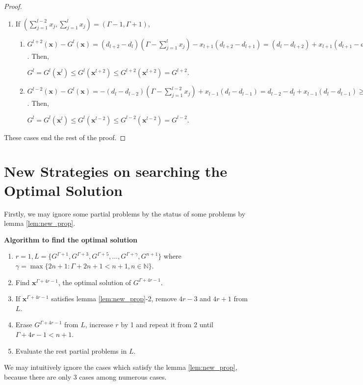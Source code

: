 \documentclass[letterpaper, 10pt]{article}
\renewcommand{\vec}[1]{\bm{#1}}
\begin{document}
\begin{proof}
\begin{enumerate}
\begin{enumerate}
\begin{center}
				$G^{l} = G^{l}(\vec{x}^{l}) \le G^{l}(\vec{x}^{l-2}) \le G^{l-2}(\vec{x}^{l-2}) = G^{l-2}$.
			\end{center}
		\end{enumerate}
		\item If $\left( \sum\limits_{j=1}^{l-2}{x_{j}}, \sum\limits_{j=1}^{l}{x_{j}}  \right) = (\Gamma - 1, \Gamma+1)$,
		\begin{enumerate}
			\item $G^{l+2}(\vec{x}) - G^{l}(\vec{x}) = (d_{l+2} - d_{l}) \left( \Gamma - \sum\limits_{j=1}^{l}{x_{j}} \right) - x_{l+1}(d_{l+2} - d_{l+1}) = (d_{l} - d_{l+2}) + x_{l+1}(d_{l+1} - d_{l+2}) \ge 0$. Then,
			\begin{center}
				$G^{l} = G^{l}(\vec{x}^{l}) \le G^{l}(\vec{x}^{l+2}) \le G^{l+2}(\vec{x}^{l+2}) = G^{l+2}$.
			\end{center}
			\item $G^{l-2}(\vec{x}) - G^{l}(\vec{x}) = -(d_{l} - d_{l-2}) \left( \Gamma - \sum\limits_{j=1}^{l-2}{x_{j}} \right) + x_{l-1}(d_{l} - d_{l-1}) =  d_{l-2} - d_{l} + x_{l-1}(d_{l} - d_{l-1}) \ge d_{l-2} - d_{l} + d_{l} - d_{l-1} = (d_{l-2} - d_{l-1}) \ge 0$. Then,
			\begin{center}
				$G^{l} = G^{l}(\vec{x}^{l}) \le G^{l}(\vec{x}^{l-2}) \le G^{l-2}(\vec{x}^{l-2}) = G^{l-2}$.
			\end{center}
		\end{enumerate}
	\end{enumerate}
	These cases end the rest of the proof.
\end{proof}

\section{New Strategies on searching the Optimal Solution}
Firstly, we may ignore some partial problems by the status of some problems by lemma \ref{lem:new_prop}.

\textbf{Algorithm to find the optimal solution}
\begin{enumerate}
	\item $r=1, L = \{ G^{\Gamma + 1}, G^{\Gamma + 3}, G^{\Gamma + 5}, \ldots, G^{\Gamma + \gamma}, G^{n+1} \}$ where $\gamma = \max\{{2n+1 : \Gamma + 2n + 1 < n+1, n \in \mathbb{N}} \}$.
	\item Find $\vec{x}^{\Gamma + 4r - 1}$, the optimal solution of $G^{\Gamma + 4r - 1}$.
	\item If $\vec{x}^{\Gamma + 4r - 1}$ satisfies lemma \ref{lem:new_prop}-2, remove $4r-3$ and $4r+1$ from $L$.
	\item Erase $G^{\Gamma + 4r - 1}$ from $L$, increase $r$ by 1 and repeat it from 2 until $\Gamma + 4r-1 < n+1$.
	\item Evaluate the rest partial problems in $L$.
\end{enumerate}
We may intuitively ignore the cases which satisfy the lemma \ref{lem:new_prop}, because there are only 3 cases among numerous cases.
\end{document}
